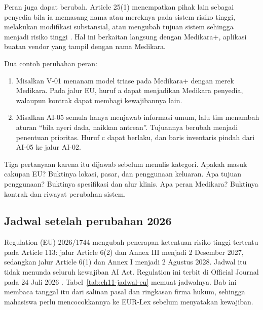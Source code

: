 Peran juga dapat berubah. Article 25(1) menempatkan pihak lain sebagai penyedia bila ia memasang
nama atau mereknya pada sistem risiko tinggi, melakukan modifikasi substansial, atau mengubah tujuan
sistem sehingga menjadi risiko tinggi \cite{c11-aiact-explorer}. Hal ini berkaitan langsung dengan
Medikara+, aplikasi buatan vendor yang tampil dengan nama Medikara.

Dua contoh perubahan peran:
\begin{enumerate}
  \item Misalkan V-01 menanam model triase pada Medikara+ dengan merek Medikara. Pada jalur EU,
  huruf a dapat menjadikan Medikara penyedia, walaupun kontrak dapat membagi kewajibannya lain.
  \item Misalkan AI-05 semula hanya menjawab informasi umum, lalu tim menambah aturan ``bila nyeri
  dada, naikkan antrean''. Tujuannya berubah menjadi penentuan prioritas. Huruf c dapat berlaku, dan
  baris inventaris pindah dari AI-05 ke jalur AI-02.
\end{enumerate}

Tiga pertanyaan karena itu dijawab sebelum menulis kategori. Apakah masuk cakupan EU? Buktinya
lokasi, pasar, dan penggunaan keluaran. Apa tujuan penggunaan? Buktinya spesifikasi dan alur klinis.
Apa peran Medikara? Buktinya kontrak dan riwayat perubahan sistem.

\subsection*{Jadwal setelah perubahan 2026}

Regulation (EU) 2026/1744 mengubah penerapan ketentuan risiko tinggi tertentu pada Article 113:
jalur Article 6(2) dan Annex III menjadi 2 Desember 2027, sedangkan jalur Article 6(1) dan Annex I
menjadi 2 Agustus 2028. Jadwal itu tidak menunda seluruh kewajiban AI Act. Regulation ini terbit di
Official Journal pada 24 Juli 2026 \cite{c11-eu2026-1744,c11-cuatrecasas2026,c11-aiact-explorer}.
Tabel~\ref{tab:ch11-jadwal-eu} memuat jadwalnya. Bab ini membaca tanggal itu dari salinan pasal dan
ringkasan firma hukum, sehingga mahasiswa perlu mencocokkannya ke EUR-Lex sebelum menyatakan
kewajiban.

